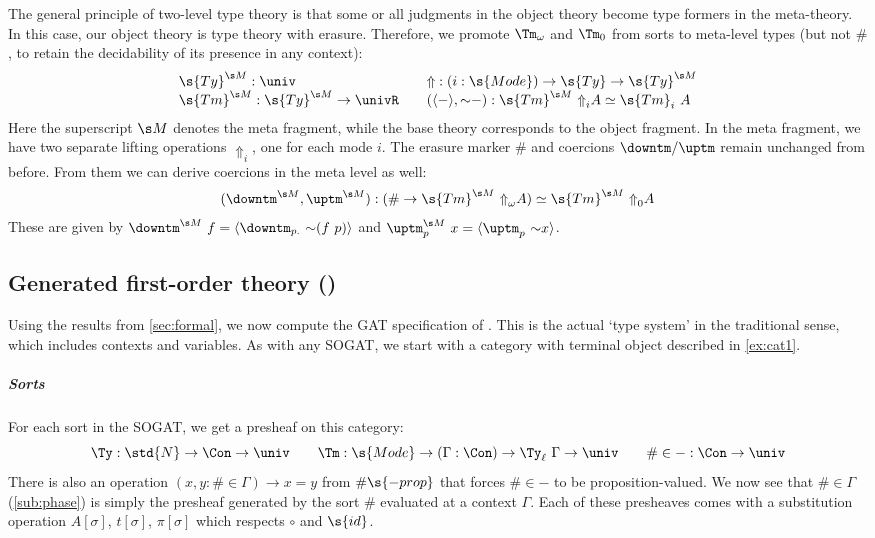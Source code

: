 The general principle of two-level type theory is that some or all judgments in
the object theory become type formers in the meta-theory. In this case, our
object theory is type theory with erasure. Therefore, we promote $\Tm_\omega$
and $\Tm_0$ from sorts to meta-level types (but not $\#$, to retain the
decidability of its presence in any context):
\[\begin{array}{l@{\qquad}l}
\s{Ty}^{\s M} : \univ & {\Uparrow} : (i : \s{Mode}) \to \s{Ty} \to \s{Ty}^{\s M} \\
\s{Tm}^{\s M} : \s{Ty}^{\s M} \to \univR & (\langle-\rangle, {\sim}-) :
\s{Tm}^{\s M}\ {\Uparrow}_i A \simeq \s{Tm}_i\ A \end{array}\]
Here the
superscript $\s M$ denotes the meta fragment, while the base theory corresponds
to the object fragment. In the meta fragment, we have two separate lifting
operations $\Uparrow_i$, one for each mode $i$. The erasure marker $\#$ and
coercions $\downtm/\uptm$ remain unchanged from before. From them we can derive
coercions in the meta level as well:
\[\begin{array}{l}
  ({\downtm}^{\s M}, {\uptm}^{\s M}) : (\# \to \s{Tm}^{\s M}\
  {\Uparrow}_\omega A) \simeq \s{Tm}^{\s M}\ {\Uparrow}_0 A
\end{array}\]
These are given by $\downtm^{\s M}\ f = \langle {\downtm}_{p.}\ {\sim}(f\ p)
\rangle$ and $\uptm^{\s M}_p\ x = \langle \uptm_p\ {\sim} x \rangle$.


\subsection{Generated first-order theory ()}\label{sub:first-order}

Using the results from \cref{sec:formal}, we now compute the GAT specification
of \ZTT. This is the actual `type system' in the traditional sense, which
includes contexts and variables. As with any SOGAT, we start with a category
with terminal object described in \cref{ex:cat1}.

\subparagraph{Sorts}

For each sort in the SOGAT, we get a presheaf on this category:
\[
\Ty : \std{N} \to \Con \to \univ \qquad \Tm : \s{Mode} \to (\Gamma : \Con) \to
\Ty_\ell\ \Gamma \to \univ \qquad {\#\in-} : \Con \to \univ
\]
There is also an operation $(x, y : \# \in \Gamma) \to x = y$ from $\#\s{-prop}$
that forces $\# \in -$ to be proposition-valued. We now see that $\#\in\Gamma$
(\cref{sub:phase}) is simply the presheaf generated by the sort $\#$ evaluated
at a context $\Gamma$. Each of these presheaves comes with a substitution
operation $A[\sigma]$, $t[\sigma]$, $\pi[\sigma]$ which respects $\circ$ and
$\s{id}$.


